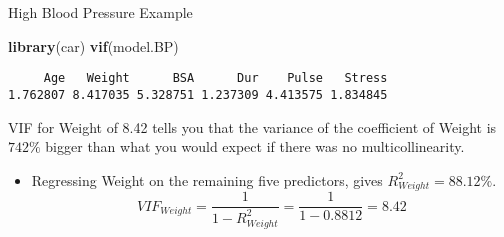 \documentclass[
  ignorenonframetext,
]{beamer}
\newenvironment{Shaded}{\begin{snugshade}}{\end{snugshade}}
\newcommand{\FunctionTok}[1]{\textcolor[rgb]{0.13,0.29,0.53}{\textbf{#1}}}
\newcommand{\NormalTok}[1]{#1}
\providecommand{\tightlist}{%
  \setlength{\itemsep}{0pt}\setlength{\parskip}{0pt}}
\begin{document}
\begin{frame}[fragile]{High Blood Pressure Example}
\protect\hypertarget{high-blood-pressure-example-3}{}
\normalsize

\begin{Shaded}
\begin{Highlighting}[]
\FunctionTok{library}\NormalTok{(car)}
\FunctionTok{vif}\NormalTok{(model.BP)}
\end{Highlighting}
\end{Shaded}

\begin{verbatim}
     Age   Weight      BSA      Dur    Pulse   Stress 
1.762807 8.417035 5.328751 1.237309 4.413575 1.834845 
\end{verbatim}

\normalsize

VIF for Weight of 8.42 tells you that the variance of the coefficient of
Weight is \(742\%\) bigger than what you would expect if there was no
multicollinearity.

\begin{itemize}
\tightlist
\item
  Regressing Weight on the remaining five predictors, gives
  \(R^2_{Weight}=88.12\%\).
  \[VIF_{Weight}=\frac{1}{1-R^2_{Weight}}=\frac{1}{1-0.8812}=8.42\]
\end{itemize}
\end{frame}
\end{document}
